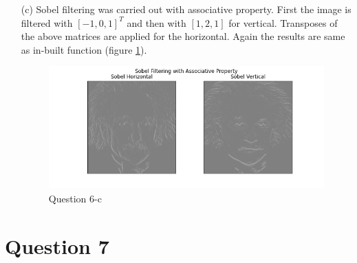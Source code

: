 \documentclass[11pt]{article}
\begin{document}
\begin{itemize}
    \item[(c)] Sobel filtering was carried out with associative property. First the image is filtered with $[-1, 0, 1]^{T}$ and then with $[1, 2, 1]$ 
    for vertical. Transposes of the above matrices are applied for the horizontal. Again the results are same as in-built function (figure \ref{53}). 

    \begin{figure}[!h]
        \centering
        \includegraphics[width=\textwidth]{Images/53.jpg}
        \caption{Question 6-c}
        \label{53}
    \end{figure}
\end{itemize}

\section*{Question 7}
\end{document}
